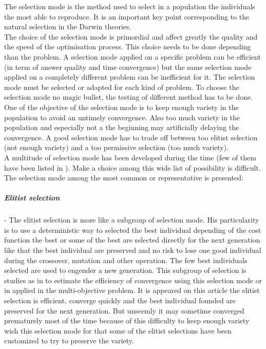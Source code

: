  The selection mode is  the method  used to select in a population the individuals the most able to reproduce. It is an important key point corresponding to the natural selection in the Darwin theories. \\
The choice of the selection mode is primordial and affect greatly the quality and the speed of the optimisation process. This choice needs to be done depending than the problem. A selection mode applied on a specific problem  can be efficient (in term of answer quality and time convergence)  but  the same  selection mode applied on  a completely different problem can be inefficient for it.  The selection mode must be selected or adapted for each kind of problem. To choose the selection mode no magic  bullet, the testing of different method has to be done.\\
One of the objective of the selection mode is to keep enough variety in the population to avoid an untimely  convergence. Also too much variety in the population and especially not a the beginning may artificially delaying the convergence. A good selection mode has to trade off between too elitist selection (not enough variety) and a too permissive selection (too much variety). \\
A multitude of selection mode has been developed during the time (few of them have been listed in \cite{123*owais2008}). Make a choice among this wide list of possibility is difficult. The selection mode among the most common  or representative is  presented:    \\

\subparagraph{Elitist selection}
-	The elitist selection is more like a subgroup of selection mode. His particularity is to use a deterministic way to selected the best individual depending of the cost function the best or some of the best are selected directly for the next generation like that the best individual are preserved and no risk  to lose one good individual during the crossover, mutation and other operation. The few best individuals selected are used to engender a new generation.
  This subgroup of selection is studies as in \cite{69*deb2000,64*matsui1999}  to estimate the efficiency of convergence using this selection mode or in \cite{140*soremekun2001} applied in the multi-objective problem. It is appeared on this article the elitist selection is efficient, converge quickly and the best individual founded are preserved  for the next generation. But unseemly it may sometime converged prematurely most of the time because of this difficulty to keep enough variety wish this selection mode for that some of the elitist selections have been customized to try to preserve the variety. \\
	
